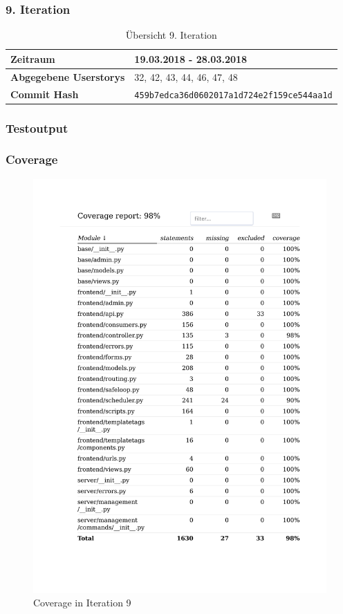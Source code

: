 \subsubsection{9. Iteration}
\begin{table}[H]
\begin{center}
	\begin{tabular}{| l | l |}
		\hline
		\textbf{Zeitraum} &  19.03.2018 - 28.03.2018\\\hline
		\textbf{Abgegebene Userstorys} & 32, 42, 43, 44, 46, 47, 48\\\hline
		\textbf{Commit Hash} & \texttt{459b7edca36d0602017a1d724e2f159ce544aa1d} \\\hline
	\end{tabular}
	\caption{Übersicht 9. Iteration}
\end{center}
\end{table}
\subsubsection{Testoutput }

\subsubsection{Coverage}
\begin{figure}[H]
	\centering
\includegraphics[width=.9\textwidth]{test_output/09_iteration_coverage.pdf}
	\caption{Coverage in Iteration 9}
\end{figure}
